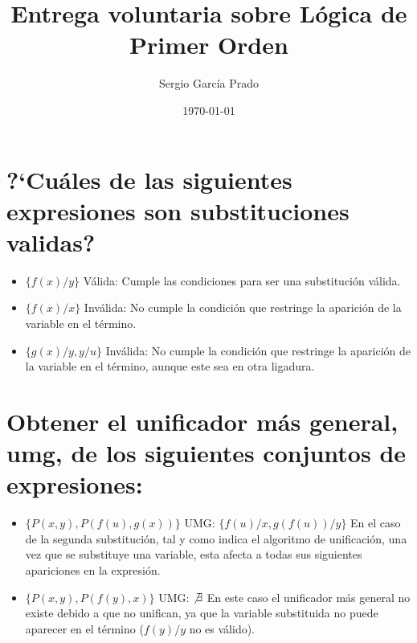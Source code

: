 \documentclass[10pt, a4paper,spanish]{article}
\title{\vspace{-15mm}\fontsize{24pt}{10pt}\selectfont\textbf{Entrega voluntaria sobre Lógica de Primer Orden}} %
\author{Sergio García Prado}
\date{\today}
\begin{document}
	\maketitle %
	\thispagestyle{fancy} %



    \section{?`Cuáles de las siguientes expresiones son substituciones validas?}

        \begin{itemize}

            \item
				$\{ f(x)/y \}$
				\newline
				Válida: Cumple las condiciones para ser una substitución válida.

			\item
				$\{ f(x)/x \}$
				\newline
				Inválida: No cumple la condición que restringe la aparición de la variable en el término.

			\item
				$\{ g(x)/y, y/u \}$
				\newline
				Inválida: No cumple la condición que restringe la aparición de la variable en el término, aunque este sea en otra ligadura.

		\end{itemize}

	\section{Obtener el unificador más general, umg, de los siguientes conjuntos de expresiones:}

		\begin{itemize}

			\item
				$\{ P(x, y), P(f(u), g(x)) \}$
				\newline
				UMG: $\{ f(u)/x, g(f(u))/y \}$
				\newline
				En el caso de la segunda substitución, tal y como indica el algoritmo de unificación, una vez que se substituye una variable, esta afecta a todas sus siguientes apariciones en la expresión.

			\item
				$\{ P(x, y), P(f(y), x) \}$
				\newline
				UMG: $\not\exists$
				\newline
				En este caso el unificador más general no existe debido a que no unifican, ya que la variable substituida no puede aparecer en el término ($ f(y)/y $ no es válido).

		\end{itemize}
\end{document}
